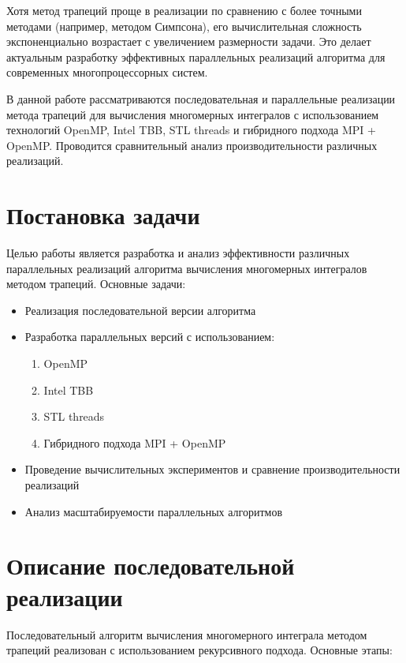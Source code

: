 \documentclass[14pt,a4paper]{extarticle}
\begin{document}
Хотя метод трапеций проще в реализации по сравнению с более точными методами (например, методом Симпсона), его вычислительная сложность экспоненциально возрастает с увеличением размерности задачи. Это делает актуальным разработку эффективных параллельных реализаций алгоритма для современных многопроцессорных систем.

В данной работе рассматриваются последовательная и параллельные реализации метода трапеций для вычисления многомерных интегралов с использованием технологий OpenMP, Intel TBB, STL threads и гибридного подхода MPI + OpenMP. Проводится сравнительный анализ производительности различных реализаций.
\newpage

\section{Постановка задачи}
Целью работы является разработка и анализ эффективности различных параллельных реализаций алгоритма вычисления многомерных интегралов методом трапеций. Основные задачи:

\begin{itemize}
    \item Реализация последовательной версии алгоритма
    \item Разработка параллельных версий с использованием:
    \begin{enumerate}
        \item OpenMP
        \item Intel TBB
        \item STL threads
        \item Гибридного подхода MPI + OpenMP
    \end{enumerate}
    \item Проведение вычислительных экспериментов и сравнение производительности реализаций
    \item Анализ масштабируемости параллельных алгоритмов
\end{itemize}
\newpage

\section{Описание последовательной реализации}
Последовательный алгоритм вычисления многомерного интеграла методом трапеций реализован с использованием рекурсивного подхода. Основные этапы:
\end{document}
